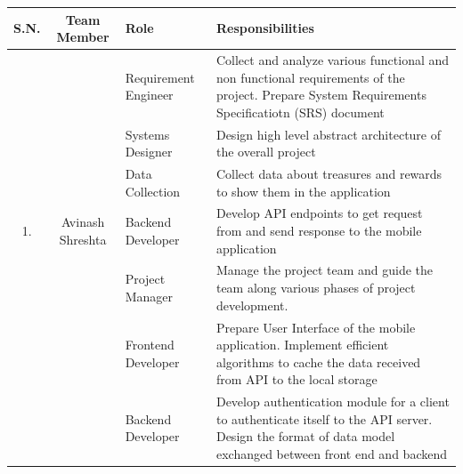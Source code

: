 \documentclass[12pt, a4paper, oneside]{article}
\begin{document}
\begin{table}[H]
\begin{tabularx}{\linewidth}{|c|c|p{2cm}|X|}
\hline
\rowcolor[HTML]{C0C0C0} 
S.N.                 & Team Member                        & Role                  & Responsibilities                                                                                                                                                                 \\ \hline
                     &                                    & Requirement Engineer & Collect and analyze various functional and non functional requirements of the project. \newline Prepare System Requirements Specificatiotn (SRS) document                                 \\ \cline{3-4} 
                     &                                    & Systems Designer      & Design high level abstract architecture of the overall project                                                                                                                   \\ \cline{3-4} 
                     &                                    & Data Collection       & Collect data about treasures and rewards to show them in the application                                                                                                         \\ \cline{3-4} 
\multirow{-4}{*}{1.} & \multirow{-4}{*}{Avinash Shreshta} & Backend Developer     & Develop API endpoints to get request from and send response to the mobile application                                                                                            \\ \hline
                     &                                    & Project Manager       & Manage the project team and guide the team along various phases of project development.                                                                                          \\ \cline{3-4} 
                     &                                    & Frontend Developer    & Prepare User Interface of the mobile application. \newline Implement efficient algorithms to cache the data received from API to the local storage                                        \\ \cline{3-4} 
                     &                                    & Backend Developer     & Develop authentication module for a client to authenticate itself to the API server. \newline Design the format of data model exchanged between front end and backend                     \\ \cline{3-4} 

\end{tabularx}
\end{table}
\end{document}
